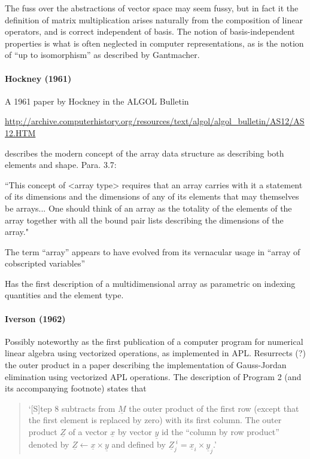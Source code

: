The fuss over the abstractions of vector space may seem fussy, but in fact it the definition of matrix multiplication arises naturally from the composition of linear operators, and is correct independent of basis. The notion of basis-independent properties is what is often neglected in computer representations, as is the notion of ``up to isomorphism'' as described by Gantmacher.



\paragraph{Hockney (1961)}

A 1961 paper by Hockney in the ALGOL Bulletin

\url{http://archive.computerhistory.org/resources/text/algol/algol_bulletin/AS12/AS12.HTM}

describes the modern concept of the array data structure as describing
both elements and shape. Para. 3.7:

“This concept of <array type> requires that an array carries with it a
statement of its dimensions and the dimensions of any of its elements
that may themselves be arrays... One should think of an array as the
totality of the elements of the array together with all the bound pair
lists describing the dimensions of the array."

The term ``array'' appears to have evolved from its vernacular usage in ``array of cobscripted variables''

Has the first description of a multidimensional array as parametric on indexing quantities and the element type.




\paragraph{Iverson (1962)~\cite{Iverson1962}}

Possibly noteworthy as the first publication of a computer program for numerical linear algebra using vectorized operations, as implemented in APL.
Resurrects (?) the outer product in a paper describing the implementation of Gauss-Jordan elimination using vectorized APL operations. The description of Program 2 (and its accompanying footnote) states that

\begin{quote}
`[S]tep 8 subtracts from $\underline{\textit{M}}$ the outer product of the first row (except that the first element is replaced by zero) with its first column. The outer product $\underline{\textit{Z}}$ of a vector $\underline{\textit{x}}$ by vector $\underline{\textit{y}}$ id the ``column by row product'' denoted by $\underline{\textit{Z}} \leftarrow \underline{\textit{x}} \times \underline{\textit{y}}$ and defined by $\underline{\textit{Z}}^{\; i}_j = \underline{\textit{x}}_i \times \underline{\textit{y}}_j$.'
\end{quote}

